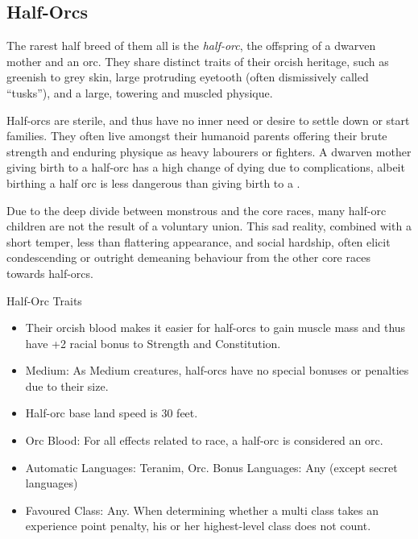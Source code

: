 \subsection{Half-Orcs}
\label{sec:Half-Orcs}

The rarest half breed of them all is the \emph{half-orc}, the offspring of a
dwarven mother and an orc. They share distinct traits of their orcish
heritage, such as greenish to grey skin, large protruding eyetooth (often
dismissively called ``tusks''), and a large, towering and muscled physique.

Half-orcs are sterile, and thus have no inner need or desire to settle down or
start families. They often live amongst their humanoid parents offering their
brute strength and enduring physique as heavy labourers or fighters. A dwarven
mother giving birth to a half-orc has a high change of dying due to
complications, albeit birthing a half orc is less dangerous than giving birth
to a .

Due to the deep divide between monstrous and the core races, many half-orc
children are not the result of a voluntary union. This sad reality, combined
with a short temper, less than flattering appearance, and social hardship,
often elicit condescending or outright demeaning behaviour from the other core
races towards half-orcs.

\begin{35e}{Half-Orc Traits}
  \begin{itemize}[noitemsep]
    \item Their orcish blood makes it easier for half-orcs to gain muscle mass
      and thus have +2 racial bonus to Strength and Constitution.
    \item Medium: As Medium creatures, half-orcs have no special bonuses or
      penalties due to their size.
    \item Half-orc base land speed is 30 feet.
    \item Orc Blood: For all effects related to race, a half-orc is considered
    an orc.
    \item Automatic Languages: Teranim, Orc. Bonus Languages: Any (except secret
      languages)
    \item Favoured Class: Any. When determining whether a multi class takes an
    experience point penalty, his or her highest-level class does not count.
  \end{itemize}
\end{35e}
